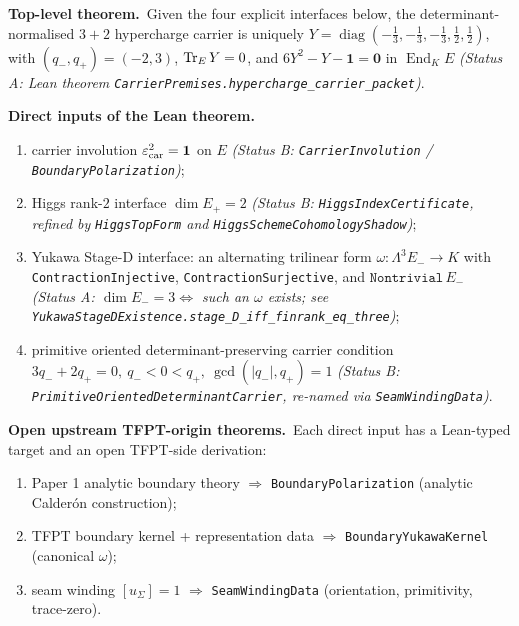 \documentclass[11pt,a4paper]{article}
\begin{document}
\begin{tfptclaimcontract}
\textbf{Top-level theorem.}\ Given the four explicit interfaces below, the determinant-normalised
$3+2$ hypercharge carrier is uniquely
$Y = \operatorname{diag}(-\tfrac13,-\tfrac13,-\tfrac13,\tfrac12,\tfrac12)$, with $(q_-,q_+)=(-2,3)$,
$\operatorname{Tr}_E Y = 0$, and $6 Y^2 - Y - \mathbf 1 = \mathbf 0$ in $\operatorname{End}_K E$
\emph{(Status A: Lean theorem
\texttt{CarrierPremises.hypercharge\_carrier\_packet})}.

\smallskip
\textbf{Direct inputs of the Lean theorem.}
\begin{enumerate}[leftmargin=1.7em, itemsep=0pt, label=(\arabic*)]
    \item carrier involution $\varepsilon_{\mathrm{car}}^2 = \mathbf 1$ on $E$
        \emph{(Status B: \texttt{CarrierInvolution} / \texttt{BoundaryPolarization})};
    \item Higgs rank-$2$ interface $\dim E_+ = 2$
        \emph{(Status B: \texttt{HiggsIndexCertificate}, refined by
        \texttt{HiggsTopForm} and \texttt{HiggsSchemeCohomologyShadow})};
    \item Yukawa Stage-D interface: an alternating trilinear form
        $\omega : \Lambda^3 E_- \to K$ with
        \texttt{ContractionInjective}, \texttt{ContractionSurjective},
        and $\texttt{Nontrivial}\,E_-$
        \emph{(Status A: $\dim E_- = 3 \iff$ such an $\omega$ exists; see
        \texttt{YukawaStageDExistence.stage\_D\_iff\_finrank\_eq\_three})};
    \item primitive oriented determinant-preserving carrier condition
        $3 q_- + 2 q_+ = 0,\ q_- < 0 < q_+,\ \gcd(|q_-|, q_+) = 1$
        \emph{(Status B: \texttt{PrimitiveOrientedDeterminantCarrier},
        re-named via \texttt{SeamWindingData})}.
\end{enumerate}

\smallskip
\textbf{Open upstream TFPT-origin theorems.}\ Each direct input has a Lean-typed target and an
open TFPT-side derivation:
\begin{enumerate}[leftmargin=1.7em, itemsep=0pt, label=(\roman*)]
    \item Paper 1 analytic boundary theory $\Rightarrow$ \texttt{BoundaryPolarization}
        (analytic Calder\'on construction);
    \item TFPT boundary kernel + representation data $\Rightarrow$
        \texttt{BoundaryYukawaKernel} (canonical $\omega$);
    \item seam winding $[u_\Sigma] = 1$ $\Rightarrow$ \texttt{SeamWindingData}
        (orientation, primitivity, trace-zero).
\end{enumerate}


\end{tfptclaimcontract}
\end{document}
